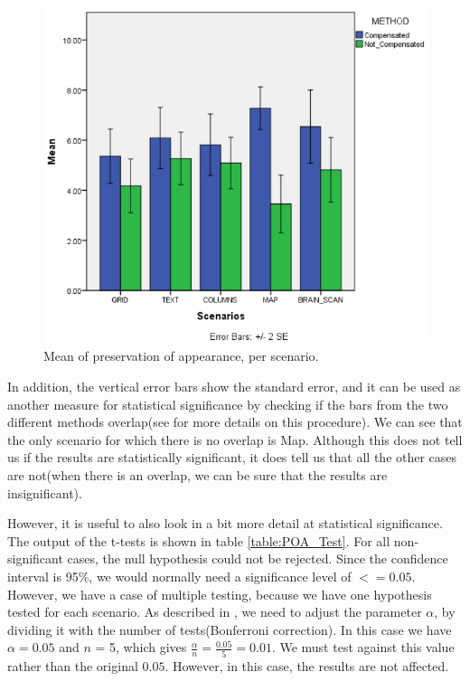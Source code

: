 \documentclass[]{article}
\begin{document}
\begin{figure}[!h]
    \centering
    \includegraphics[width=1.0\textwidth]{figures/results/POA_Graph.PNG}
    \caption{Mean of preservation of appearance, per scenario.}
    \label{fig:POA_Graph}
\end{figure}

In addition, the vertical error bars show the standard error, and it can be used as another measure for statistical significance by checking if the bars from the two different methods overlap(see \cite{error_bars} for more details on this procedure). We can see that the only scenario for which there is no overlap is Map. Although this does not tell us if the results are statistically significant, it does tell us that all the other cases are not(when there is an overlap, we can be sure that the results are insignificant).

However, it is useful to also look in a bit more detail at statistical significance. The output of the t-tests is shown in table \ref{table:POA_Test}. For all non-significant cases, the null hypothesis could not be rejected. Since the confidence interval is 95\%, we would normally need a significance level of $<= 0.05$. However, we have a case of multiple testing, because we have one hypothesis tested for each scenario. As described in \cite{bonferroni}, we need to adjust the parameter $\alpha$, by dividing it with the number of tests(Bonferroni correction). In this case we have $\alpha = 0.05$ and $n$ = 5, which gives $\frac{\alpha}{n} = \frac{0.05}{5} = 0.01$. We must test against this value rather than the original $0.05$. However, in this case, the results are not affected.
\end{document}
